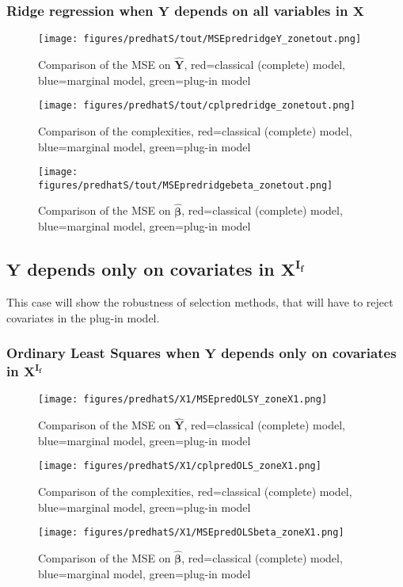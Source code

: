\documentclass[12pt,a4paper]{report}
\begin{document}
\subsubsection{Ridge regression when $\boldsymbol{Y}$ depends on all variables in $\boldsymbol{X}$}

\begin{figure}[h!]
	\centering
		  \texttt{[image: figures/predhatS/tout/MSEpredridgeY\_zonetout.png]}
		\caption{Comparison of the MSE on $\hat{\boldsymbol{Y}}$, red=classical (complete) model, blue=marginal model, green=plug-in model}\label{MSEpredridgeY_zonetout}
	\end{figure}
	\begin{figure}[h!]
	\centering
		  \texttt{[image: figures/predhatS/tout/cplpredridge\_zonetout.png]}
		\caption{Comparison of the complexities, red=classical (complete) model, blue=marginal model, green=plug-in model}\label{cplpredridge_zonetout}
	\end{figure}
	\begin{figure}[h!]
	\centering
		  \texttt{[image: figures/predhatS/tout/MSEpredridgebeta\_zonetout.png]}
		\caption{Comparison of the MSE on $\hat{\boldsymbol{\beta}}$, red=classical (complete) model, blue=marginal model, green=plug-in model}\label{MSEpredridgebeta_zonetout}
	\end{figure}
	\FloatBarrier

\clearpage
\subsection{$\boldsymbol{Y}$ depends only on covariates in $\boldsymbol{X^{I_f}}$}	 \label{tableMSEsimdroitepred}
This case will show the robustness of selection methods, that will have to reject covariates in the plug-in model.

\subsubsection{Ordinary Least Squares when $\boldsymbol{Y}$ depends only on covariates in $\boldsymbol{X^{I_f}}$}

	\begin{figure}[h!]
	\centering
		  \texttt{[image: figures/predhatS/X1/MSEpredOLSY\_zoneX1.png]}
		\caption{Comparison of the MSE on $\hat{\boldsymbol{Y}}$, red=classical (complete) model, blue=marginal model, green=plug-in model}\label{MSEpredOLSY_zoneX1}
	\end{figure}
	\begin{figure}[h!]
	\centering
		  \texttt{[image: figures/predhatS/X1/cplpredOLS\_zoneX1.png]}
		\caption{Comparison of the complexities, red=classical (complete) model, blue=marginal model, green=plug-in model}\label{cplpredOLS_zoneX1}
	\end{figure}
	\begin{figure}[h!]
	\centering
		  \texttt{[image: figures/predhatS/X1/MSEpredOLSbeta\_zoneX1.png]}
		\caption{Comparison of the MSE on $\hat{\boldsymbol{\beta}}$, red=classical (complete) model, blue=marginal model, green=plug-in model}\label{MSEpredOLSbeta_zoneX1}
	\end{figure}
	\FloatBarrier
\newpage
\end{document}
